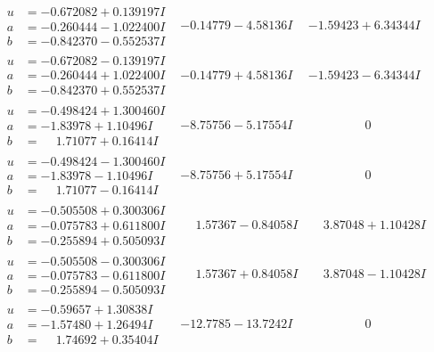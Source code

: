 \documentclass[1p]{elsarticle_modified}
\theoremstyle{definition}
\begin{document}
$$\begin{array}{c|c|c}
\begin{aligned}
u &= -0.672082 + 0.139197 I \\
a &= -0.260444 - 1.022400 I \\
b &= -0.842370 - 0.552537 I\end{aligned}
 & -0.14779 - 4.58136 I & -1.59423 + 6.34344 I \\ \hline\begin{aligned}
u &= -0.672082 - 0.139197 I \\
a &= -0.260444 + 1.022400 I \\
b &= -0.842370 + 0.552537 I\end{aligned}
 & -0.14779 + 4.58136 I & -1.59423 - 6.34344 I \\ \hline\begin{aligned}
u &= -0.498424 + 1.300460 I \\
a &= -1.83978 + 1.10496 I \\
b &= \phantom{-}1.71077 + 0.16414 I\end{aligned}
 & -8.75756 - 5.17554 I & \phantom{-0.000000 } 0 \\ \hline\begin{aligned}
u &= -0.498424 - 1.300460 I \\
a &= -1.83978 - 1.10496 I \\
b &= \phantom{-}1.71077 - 0.16414 I\end{aligned}
 & -8.75756 + 5.17554 I & \phantom{-0.000000 } 0 \\ \hline\begin{aligned}
u &= -0.505508 + 0.300306 I \\
a &= -0.075783 + 0.611800 I \\
b &= -0.255894 + 0.505093 I\end{aligned}
 & \phantom{-}1.57367 - 0.84058 I & \phantom{-}3.87048 + 1.10428 I \\ \hline\begin{aligned}
u &= -0.505508 - 0.300306 I \\
a &= -0.075783 - 0.611800 I \\
b &= -0.255894 - 0.505093 I\end{aligned}
 & \phantom{-}1.57367 + 0.84058 I & \phantom{-}3.87048 - 1.10428 I \\ \hline\begin{aligned}
u &= -0.59657 + 1.30838 I \\
a &= -1.57480 + 1.26494 I \\
b &= \phantom{-}1.74692 + 0.35404 I\end{aligned}
 & -12.7785 - 13.7242 I & \phantom{-0.000000 } 0 \\ \hline\begin{aligned}

\end{aligned}
\end{array}$$
\end{document}
